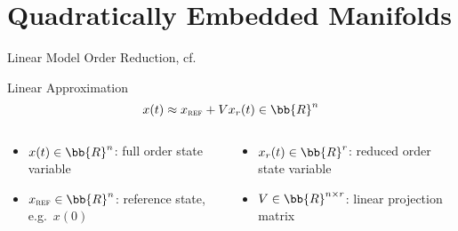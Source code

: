 \section{Quadratically Embedded Manifolds}

\begin{frame}{Linear Model Order Reduction, cf.~\cite{Geelen2023}}
    \begin{block}{Linear Approximation}
        \begin{equation*}
            x(t) \approx x_{\textsc{ref}} + V x_r(t) \in \bb{R}^n
        \end{equation*}
    \end{block}

    \begin{columns}
        \begin{column}{.49\textwidth}
            \begin{itemize}
                \item $x(t) \in \bb{R}^n$: full order state variable
                \item $x_{\textsc{ref}} \in \bb{R}^n$: reference state, e.g.\ $x(0)$
            \end{itemize}
        \end{column}
        \begin{column}{.49\textwidth}
            \begin{itemize}
                \item $x_r(t) \in \bb{R}^r$: reduced order state variable
                \item $V \in \bb{R}^{n \times r}$: linear projection matrix
            \end{itemize}
        \end{column}
    \end{columns}

\end{frame}

